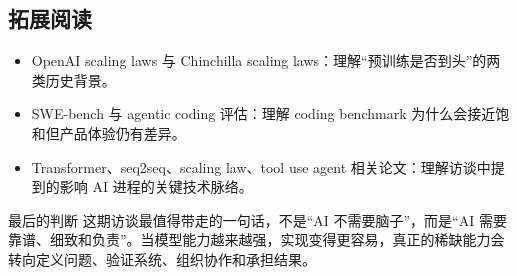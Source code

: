 \documentclass[a4paper]{article}
\begin{document}
\subsection{拓展阅读}

\begin{itemize}
\item OpenAI scaling laws 与 Chinchilla scaling laws：理解“预训练是否到头”的两类历史背景。
\item SWE-bench 与 agentic coding 评估：理解 coding benchmark 为什么会接近饱和但产品体验仍有差异。
\item Transformer、seq2seq、scaling law、tool use agent 相关论文：理解访谈中提到的影响 AI 进程的关键技术脉络。
\end{itemize}

\begin{importantbox}{最后的判断}
这期访谈最值得带走的一句话，不是“AI 不需要脑子”，而是“AI 需要靠谱、细致和负责”。当模型能力越来越强，实现变得更容易，真正的稀缺能力会转向定义问题、验证系统、组织协作和承担结果。
\end{importantbox}
\end{document}
